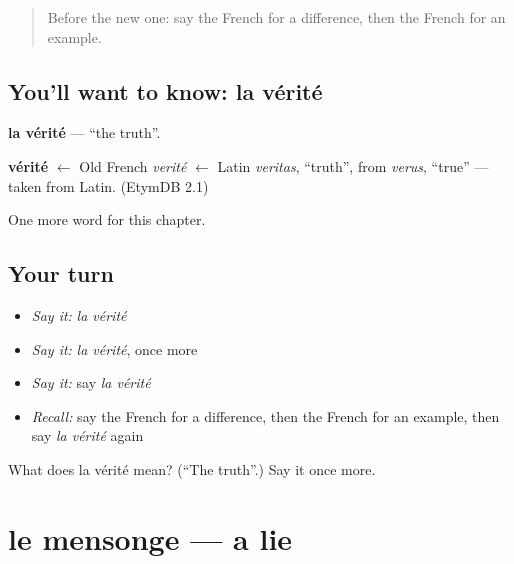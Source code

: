 \label{lesson:FR-C251-verite}



\begin{quote}
Before the new one: say the French for a difference, then the French for an example.
\end{quote}

\subsection*{You'll want to know: la vérité}
\textbf{la vérité} — \textquotedblleft{}the truth\textquotedblright{}.

\begin{cousinweb}
\textbf{vérité} $\leftarrow$ Old French \emph{verité} $\leftarrow$ Latin \emph{veritas}, \textquotedblleft{}truth\textquotedblright{}, from \emph{verus}, \textquotedblleft{}true\textquotedblright{} — taken from Latin. (EtymDB 2.1)
\end{cousinweb}

\begin{grammarlens}[title={What you've built}]
One more word for this chapter.
\end{grammarlens}

\subsection*{Your turn}
\begin{itemize}
\raggedright
  \item \emph{Say it:} \emph{la vérité}
  \item \emph{Say it:} \emph{la vérité}, once more
  \item \emph{Say it:} say \emph{la vérité}
  \item \emph{Recall:} say the French for a difference, then the French for an example, then say \emph{la vérité} again
\end{itemize}

\begin{tcolorbox}[breakable,colback=teal!4,colframe=teal!35!black,title={Before you move on}]
What does la vérité mean? (\textquotedblleft{}The truth\textquotedblright{}.) Say it once more.
\end{tcolorbox}
\section[le mensonge]{le mensonge — a lie}

\label{lesson:FR-C251-mensonge}



